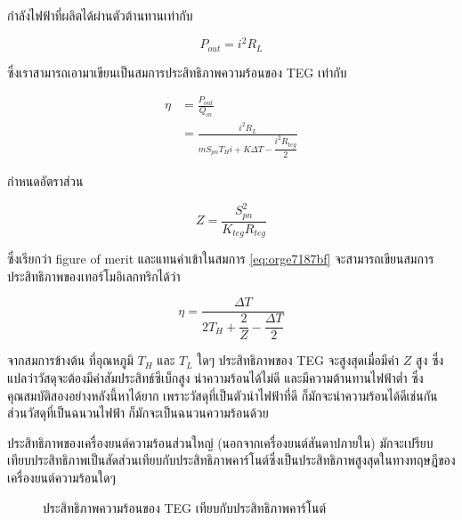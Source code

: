 \documentclass[a4paper,nobib,openany]{tufte-book}
\begin{document}
กำลังไฟฟ้าที่ผลิตได้ผ่านตัวต้านทานเท่ากับ

\[P_{out} = i^2 R_L\]

ซึ่งเราสามารถเอามาเขียนเป็นสมการประสิทธิภาพความร้อนของ TEG เท่ากับ

\begin{align}
\label{eq:orge7187bf}
  \eta &= \frac{P_{out}}{Q_{in}} \\
  &= \frac{i^2 R_L}{ m S_{pn} T_H i + K \Delta T - \dfrac{ i^2 R_{teg}}{2}}
\end{align}

กำหนดอัตราส่วน

\begin{equation}
\label{eq:fig of merit}
 Z = \frac{S_{pn}^2}{K_{teg} R_{teg}}
\end{equation}

ซึ่งเรียกว่า figure of merit และแทนค่าเข้าในสมการ \ref{eq:orge7187bf} จะสามารถเขียนสมการประสิทธิภาพของเทอร์โมอิเลกทริกได้ว่า

\begin{equation}
\label{eq:orga596609}
  \eta = \dfrac{ \Delta T }{ 2 T_H + \dfrac{2}{Z} - \dfrac{ \Delta T }{ 2 } }
\end{equation}

จากสมการข้างต้น ที่อุณหภูมิ \(T_H\) และ \(T_L\) ใดๆ ประสิทธิภาพของ TEG
จะสูงสุดเมื่อมีค่า \(Z\) สูง
ซึ่งแปลว่าวัสดุจะต้องมีค่าสัมประสิทธ์ซีเบ็กสูง นำความร้อนได้ไม่ดี
และมีความต้านทานไฟฟ้าต่ำ ซึ่งคุณสมบัติสองอย่างหลังนี้หาได้ยาก
เพราะวัสดุที่เป็นตัวนำไฟฟ้าที่ดี ก็มักจะนำความร้อนได้ดีเช่นกัน
ส่วนวัสดุที่เป็นฉนวนไฟฟ้า ก็มักจะเป็นฉนวนความร้อนด้วย

ประสิทธิภาพของเครื่องยนต์ความร้อนส่วนใหญ่ (นอกจากเครื่องยนต์สันดาปภายใน)
มักจะเปรียบเทียบประสิทธิภาพเป็นสัดส่วนเทียบกับประสิทธิภาพคาร์โนต์ซึ่งเป็นประสิทธิภาพสูงสุดในทางทฤษฎีของเครื่องยนต์ความร้อนใดๆ

\begin{figure}[h]
  \centering
\caption{\label{fig:teg vs carnot efficiency}ประสิทธิภาพความร้อนของ TEG เทียบกับประสิทธิภาพคาร์โนต์}
\end{figure}
\end{document}
